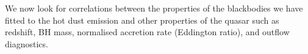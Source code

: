 We now look for correlations between the properties of the blackbodies we have fitted to the hot dust emission and other properties of the quasar such as redshift, BH mass, normalised accretion rate (Eddington ratio), and outflow diagnostics.  






